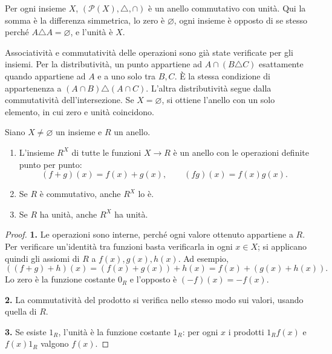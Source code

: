 \begin{esempio}
Per ogni insieme $X$, $(\mathcal P(X),\triangle,\cap)$ è un anello commutativo con unità. Qui la somma è la differenza simmetrica, lo zero è $\varnothing$, ogni insieme è opposto di se stesso perché $A\triangle A=\varnothing$, e l'unità è $X$.

Associatività e commutatività delle operazioni sono già state verificate per gli insiemi. Per la distributività, un punto appartiene ad $A\cap(B\triangle C)$ esattamente quando appartiene ad $A$ e a uno solo tra $B,C$. È la stessa condizione di appartenenza a $(A\cap B)\triangle(A\cap C)$. L'altra distributività segue dalla commutatività dell'intersezione. Se $X=\varnothing$, si ottiene l'anello con un solo elemento, in cui zero e unità coincidono.
\end{esempio}

\begin{proposizione}
Siano $X\ne\varnothing$ un insieme e $R$ un anello.
\begin{enumerate}[label=\arabic*.]
\item L'insieme $R^X$ di tutte le funzioni $X\to R$ è un anello con le operazioni definite punto per punto:
\[
(f+g)(x)=f(x)+g(x),\qquad(fg)(x)=f(x)g(x).
\]
\item Se $R$ è commutativo, anche $R^X$ lo è.
\item Se $R$ ha unità, anche $R^X$ ha unità.
\end{enumerate}
\end{proposizione}
\begin{proof}
\textbf{1.} Le operazioni sono interne, perché ogni valore ottenuto appartiene a $R$. Per verificare un'identità tra funzioni basta verificarla in ogni $x\in X$; si applicano quindi gli assiomi di $R$ a $f(x),g(x),h(x)$. Ad esempio,
\[
((f+g)+h)(x)=(f(x)+g(x))+h(x)=f(x)+(g(x)+h(x)).
\]
Lo zero è la funzione costante $0_R$ e l'opposto è $(-f)(x)=-f(x)$.

\textbf{2.} La commutatività del prodotto si verifica nello stesso modo sui valori, usando quella di $R$.

\textbf{3.} Se esiste $1_R$, l'unità è la funzione costante $1_R$: per ogni $x$ i prodotti $1_Rf(x)$ e $f(x)1_R$ valgono $f(x)$.
\end{proof}

